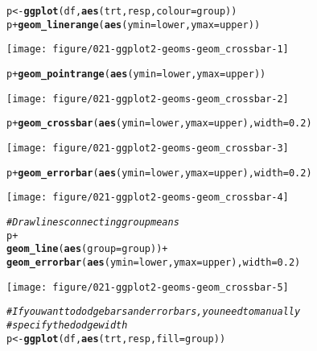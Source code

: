 \documentclass[a4paper,titlepage]{tufte-handout}\usepackage[]{graphicx}\usepackage[]{color}
\makeatletter
\def\maxwidth{ %
  \ifdim\Gin@nat@width>\linewidth
    \linewidth
  \else
    \Gin@nat@width
  \fi
}
\newcommand{\hlnum}[1]{\textcolor[rgb]{0.686,0.059,0.569}{#1}}%
\newcommand{\hlcom}[1]{\textcolor[rgb]{0.678,0.584,0.686}{\textit{#1}}}%
\newcommand{\hlopt}[1]{\textcolor[rgb]{0,0,0}{#1}}%
\newcommand{\hlstd}[1]{\textcolor[rgb]{0.345,0.345,0.345}{#1}}%
\newcommand{\hlkwb}[1]{\textcolor[rgb]{0.69,0.353,0.396}{#1}}%
\newcommand{\hlkwc}[1]{\textcolor[rgb]{0.333,0.667,0.333}{#1}}%
\newcommand{\hlkwd}[1]{\textcolor[rgb]{0.737,0.353,0.396}{\textbf{#1}}}%
\newenvironment{kframe}{%
 \def\at@end@of@kframe{}%
 \ifinner\ifhmode%
  \def\at@end@of@kframe{\end{minipage}}%
  \begin{minipage}{\columnwidth}%
 \fi\fi%
 \def\FrameCommand##1{\hskip\@totalleftmargin \hskip-\fboxsep
 \colorbox{shadecolor}{##1}\hskip-\fboxsep
     \hskip-\linewidth \hskip-\@totalleftmargin \hskip\columnwidth}%
 \MakeFramed {\advance\hsize-\width
   \@totalleftmargin\z@ \linewidth\hsize
   \@setminipage}}%
 {\par\unskip\endMakeFramed%
 \at@end@of@kframe}
\newenvironment{knitrout}{}{} %
\makeatother
\begin{document}
\begin{knitrout}
\begin{kframe}
\begin{alltt}
\hlstd{p} \hlkwb{<-} \hlkwd{ggplot}\hlstd{(df,} \hlkwd{aes}\hlstd{(trt, resp,} \hlkwc{colour} \hlstd{= group))}
\hlstd{p} \hlopt{+} \hlkwd{geom_linerange}\hlstd{(}\hlkwd{aes}\hlstd{(}\hlkwc{ymin} \hlstd{= lower,} \hlkwc{ymax} \hlstd{= upper))}
\end{alltt}
\end{kframe}
\texttt{[image: figure/021-ggplot2-geoms-geom\_crossbar-1]} 
\begin{kframe}\begin{alltt}
\hlstd{p} \hlopt{+} \hlkwd{geom_pointrange}\hlstd{(}\hlkwd{aes}\hlstd{(}\hlkwc{ymin} \hlstd{= lower,} \hlkwc{ymax} \hlstd{= upper))}
\end{alltt}
\end{kframe}
\texttt{[image: figure/021-ggplot2-geoms-geom\_crossbar-2]} 
\begin{kframe}\begin{alltt}
\hlstd{p} \hlopt{+} \hlkwd{geom_crossbar}\hlstd{(}\hlkwd{aes}\hlstd{(}\hlkwc{ymin} \hlstd{= lower,} \hlkwc{ymax} \hlstd{= upper),} \hlkwc{width} \hlstd{=} \hlnum{0.2}\hlstd{)}
\end{alltt}
\end{kframe}
\texttt{[image: figure/021-ggplot2-geoms-geom\_crossbar-3]} 
\begin{kframe}\begin{alltt}
\hlstd{p} \hlopt{+} \hlkwd{geom_errorbar}\hlstd{(}\hlkwd{aes}\hlstd{(}\hlkwc{ymin} \hlstd{= lower,} \hlkwc{ymax} \hlstd{= upper),} \hlkwc{width} \hlstd{=} \hlnum{0.2}\hlstd{)}
\end{alltt}
\end{kframe}
\texttt{[image: figure/021-ggplot2-geoms-geom\_crossbar-4]} 
\begin{kframe}\begin{alltt}
\hlcom{# Draw lines connecting group means}
\hlstd{p} \hlopt{+}
  \hlkwd{geom_line}\hlstd{(}\hlkwd{aes}\hlstd{(}\hlkwc{group} \hlstd{= group))} \hlopt{+}
  \hlkwd{geom_errorbar}\hlstd{(}\hlkwd{aes}\hlstd{(}\hlkwc{ymin} \hlstd{= lower,} \hlkwc{ymax} \hlstd{= upper),} \hlkwc{width} \hlstd{=} \hlnum{0.2}\hlstd{)}
\end{alltt}
\end{kframe}
\texttt{[image: figure/021-ggplot2-geoms-geom\_crossbar-5]} 
\begin{kframe}\begin{alltt}
\hlcom{# If you want to dodge bars and errorbars, you need to manually}
\hlcom{# specify the dodge width}
\hlstd{p} \hlkwb{<-} \hlkwd{ggplot}\hlstd{(df,} \hlkwd{aes}\hlstd{(trt, resp,} \hlkwc{fill} \hlstd{= group))}

\end{alltt}
\end{kframe}
\end{knitrout}
\end{document}
